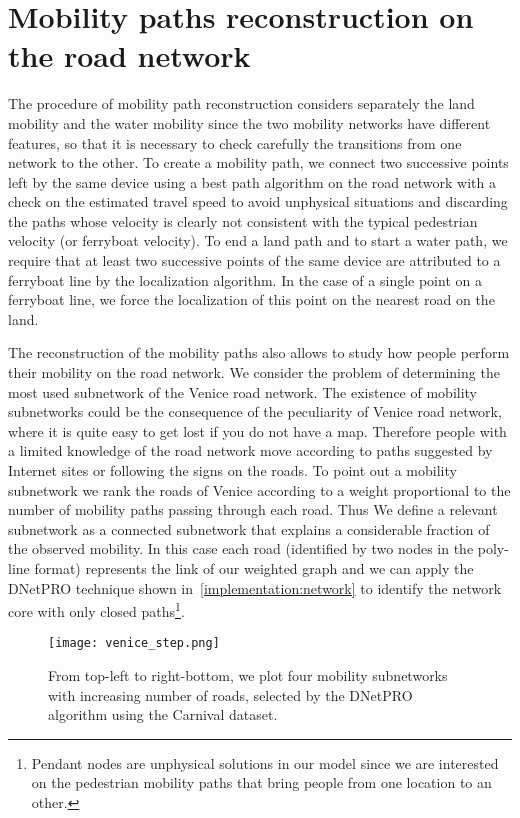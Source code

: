\documentclass{standalone}
\begin{document}
\section*{Mobility paths reconstruction on the road network}

The procedure of mobility path reconstruction considers separately the land mobility and the water mobility since the two mobility networks have different features, so that it is necessary to check carefully the transitions from one network to the other.
To create a mobility path, we connect two successive points left by the same device using a best path algorithm on the road network with a check on the estimated travel speed to avoid unphysical situations and discarding the paths whose velocity is clearly not consistent with
the typical pedestrian velocity (or ferryboat velocity).
To end a land path and to start a water path, we require that at least two successive points of the same device are attributed to a ferryboat line by the localization algorithm.
In the case of a single point on a ferryboat line, we force the localization of this point on the nearest road on the land.

The reconstruction of the mobility paths also allows to study how people perform their mobility on the road network.
We consider the problem of determining the most used subnetwork of the Venice road network.
The existence of mobility subnetworks could be the consequence of the peculiarity of Venice road network, where it is quite easy to get lost
if you do not have a map.
Therefore people with a limited knowledge of the road network move according to paths suggested by Internet sites or following the signs on the roads.
To point out a mobility subnetwork we rank the roads of Venice according to a weight proportional to the number of mobility paths passing through each road.
Thus We define a relevant subnetwork as a connected subnetwork that explains a considerable fraction of the observed mobility.
In this case each road (identified by two nodes in the poly-line format) represents the link of our weighted graph and we can apply the \textsf{DNetPRO} technique shown in~\ref{implementation:network} to identify the network core with only closed paths\footnote{
  Pendant nodes are unphysical solutions in our model since we are interested on the pedestrian mobility paths that bring people from one location to an other.
}.

\begin{center}
\begin{figure}[htbp]
\centering
\texttt{[image: venice\_step.png]}
\caption{From top-left to right-bottom, we plot four mobility subnetworks with increasing number of roads, selected by the \textsf{DNetPRO} algorithm using the Carnival dataset.
}
\label{fig:venice_step}
\end{figure}
\end{center}
\end{document}
